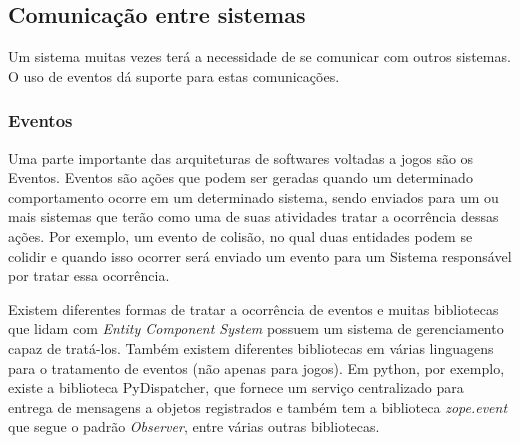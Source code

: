 

\subsection{Comunicação entre sistemas}
Um sistema muitas vezes terá a necessidade de se comunicar com outros sistemas. O uso de eventos dá suporte para estas comunicações.
\subsubsection{Eventos}
Uma parte importante das arquiteturas de softwares voltadas a jogos são os Eventos.
Eventos são ações que podem ser geradas quando um determinado comportamento ocorre em um determinado sistema, sendo enviados para um ou mais sistemas que terão como uma de suas atividades tratar a ocorrência dessas ações. Por exemplo, um evento de colisão, no qual duas entidades podem se colidir e quando isso ocorrer será enviado um evento para um Sistema responsável por tratar essa ocorrência.

Existem diferentes formas de tratar a ocorrência de eventos e muitas bibliotecas que lidam com \textit{Entity Component System} possuem um sistema de gerenciamento capaz de tratá-los. Também existem diferentes bibliotecas em várias linguagens para o tratamento de eventos (não apenas para jogos). Em python, por exemplo, existe a biblioteca PyDispatcher, que fornece um serviço centralizado para entrega de mensagens a objetos registrados \cite{pydispatcher} e também tem a biblioteca \textit{zope.event} \cite{Zope} que segue o padrão \textit{Observer}, entre várias outras bibliotecas.

